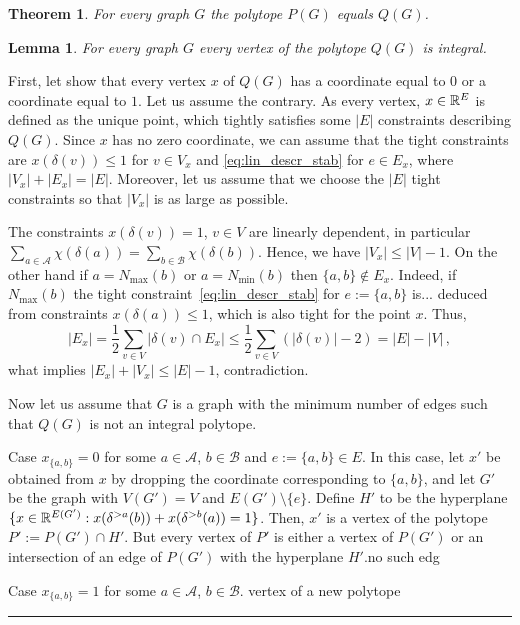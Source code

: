 \documentclass[preprint]{elsarticle}
\newtheorem{lemma}[fact]{Lemma}
\newtheorem{theorem}[fact]{Theorem}
\newenvironment{proof}{{\bf Proof:  }}{\hfill\rule{2mm}{2mm}}
\begin{document}
\begin{theorem}
	For every graph $G$ the polytope $P(G)$ equals $Q(G)$.
\end{theorem}


\begin{lemma}
	For every graph $G$ every vertex of the polytope $Q(G)$ is integral.
\end{lemma}
\begin{proof}
First, let show that every vertex $x$ of $Q(G)$ has a coordinate equal to $0$ or a coordinate equal to $1$. Let us assume the contrary. As every vertex, $x\in \mathbb{R}^E$ is defined as the unique point, which tightly satisfies some $|E|$ constraints describing $Q(G)$. Since $x$ has no zero coordinate, we can assume  that the tight constraints are $x(\delta(v))\le 1$ for $v\in V_x$ and \eqref{eq:lin_descr_stab} for $e\in E_x$, where $|V_x|+|E_x|=|E|$. Moreover, let us assume that we choose the $|E|$ tight constraints so that $|V_x|$ is as large as possible. 

The constraints $x(\delta(v))=1$, $v\in V$ are linearly dependent, in particular $\sum_{a\in\mathcal{A}}\chi(\delta(a))=\sum_{b\in\mathcal{B}}\chi(\delta(b))$. Hence, we have $|V_x|\le |V|-1$. {\color{red}On the other hand if $a=N_{\max}(b)$ or $a=N_{\min}(b)$ then $\{a,b\}\not\in E_x$. Indeed, if $N_{\max}(b)$ the tight constraint~\eqref{eq:lin_descr_stab} for $e:=\{a,b\}$  is... deduced from constraints $x(\delta(a))\le 1$, which is also tight for the point $x$.} Thus, 
$$
	|E_x|=\frac{1}{2}\sum_{v\in V} |\delta(v)\cap E_x|\le  \frac{1}{2}\sum_{v\in V} (|\delta(v)|-2)= |E|-|V|\,,
$$
what implies $|E_x|+|V_x|\le |E|-1$, contradiction.

\bigskip

Now let us assume that $G$ is a graph with the minimum number of edges such that $Q(G)$ is not an integral polytope.

Case $x_{\{a,b\}}=0$ for some $a\in \mathcal{A}$, $b\in\mathcal{B}$ and $e:=\{a,b\}\in E$. In this case, let $x'$ be obtained from $x$ by dropping the coordinate corresponding to $\{a,b\}$, and let $G'$ be the graph with $V(G')=V$ and $E(G')\setminus \{e\}$. Define $H'$ to be the hyperplane $\{x\in \mathbb{R}^{E(G')}: x(\delta^{>a}(b))+ x(\delta^{>b}(a))=1\}$. Then, $x'$ is a vertex of the polytope $P':=P(G')\cap H'$.
But every vertex of $P'$ is either a vertex of $P(G')$ or an intersection of an edge of $P(G')$ with the hyperplane $H'$.{\color{red}no such edg}

Case $x_{\{a,b\}}=1$ for some $a\in \mathcal{A}$, $b\in\mathcal{B}$. {\color{red}vertex of a new polytope}
\end{proof}
\end{document}
